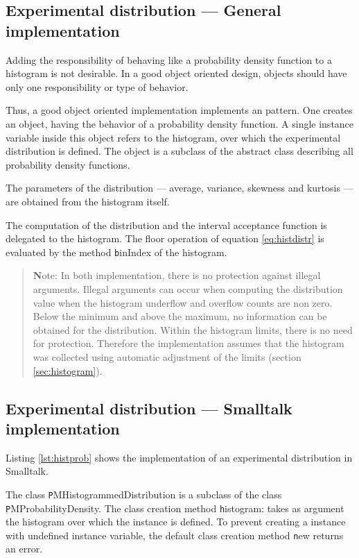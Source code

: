 \subsection{Experimental distribution --- General  implementation}
 Adding the responsibility of
behaving like a probability density function to a histogram is not
desirable. In a good object oriented design, objects should have
only one responsibility or type of behavior.

Thus, a good object oriented implementation implements an
 pattern. One creates an object, having the
behavior of a probability density function. A single instance
variable inside this object refers to the histogram, over which
the experimental distribution is defined. The 
object is a subclass of the abstract class describing all
probability density functions.

The parameters of the distribution --- average, variance, skewness
and kurtosis --- are obtained from the histogram itself.

The computation of the distribution and the interval acceptance
function is delegated to the histogram. The floor operation of
equation \ref{eq:histdistr} is evaluated by the method {\texttt
binIndex} of the histogram.

\begin{quote}
{\textbf Note:} In both implementation, there is no protection against
illegal arguments. Illegal arguments can occur when computing the
distribution value when the histogram underflow and overflow
counts are non zero. Below the minimum and above the maximum, no
information can be obtained for the distribution. Within the
histogram limits, there is no need for protection. Therefore the
implementation assumes that the histogram was collected using
automatic adjustment of the limits (\cf section
\ref{sec:histogram}).
\end{quote}

\subsection{Experimental distribution --- Smalltalk  implementation}
Listing \ref{lst:histprob} shows the implementation of an
experimental distribution in Smalltalk.

The class {\texttt PMHistogrammedDistribution} is a subclass of the
class {\texttt PMProbabilityDensity}. The class creation method {\texttt
histogram:} takes as argument the histogram over which the
instance is defined. To prevent creating a instance with undefined
instance variable, the default class creation method {\texttt new}
returns an error.


